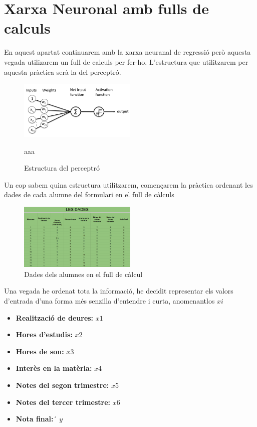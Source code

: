 \section{Xarxa Neuronal amb fulls de calculs}\label{sec:11}
En aquest apartat continuarem amb la xarxa neuranal de regressió però aquesta vegada utilizarem un full de calculs per fer-ho.
 L'estructura que utilitzarem per aquesta pràctica serà la del perceptró.

\begin{figure}[H]
    \centering
    \includegraphics[width=0.5\textwidth]{./figures/perceptro.png}
    \caption{Estructura del perceptró}aaa
\end{figure}

Un cop sabem quina estructura utilitzarem, començarem la pràctica ordenant les dades de cada alumne del formulari en el full de càlculs

\begin{figure}[H]
    \centering
    \includegraphics[width=0.5\textwidth]{./figures/Dades.png}
    \caption{Dades dels alumnes en el full de càlcul}
\end{figure}

Una vegada he ordenat tota la informació, he decidit representar els valors d'entrada d'una forma més senzilla d'entendre i curta, anomenantlos $xi$
\begin{itemize}
 \item \textbf {Realització de deures:} $x1$
 \item \textbf {Hores d'estudis:} $x2$
 \item \textbf {Hores de son:} $x3$
 \item \textbf {Interès en la matèria:} $x4$
 \item \textbf {Notes del segon trimestre:} $x5$
 \item \textbf {Notes del tercer trimestre:} $x6$
 \item \textbf {Nota final:}´ $y$
\end{itemize}


